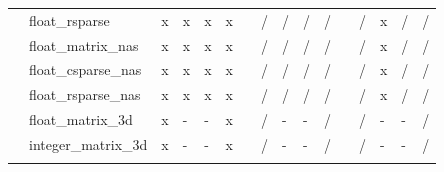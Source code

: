\documentclass{article}
\begin{document}
\begin{longtable}{llllllllllllllll}
                & float\_rsparse            & \cellcolor[HTML]{B7E1CD}x & \cellcolor[HTML]{B7E1CD}x & \cellcolor[HTML]{B7E1CD}x & \cellcolor[HTML]{B7E1CD}x &  & \cellcolor[HTML]{F4CCCC}/ & \cellcolor[HTML]{F4CCCC}/ & \cellcolor[HTML]{F4CCCC}/ & \cellcolor[HTML]{F4CCCC}/ &  & \cellcolor[HTML]{F4CCCC}/ & \cellcolor[HTML]{B7E1CD}x & \cellcolor[HTML]{F4CCCC}/ & \cellcolor[HTML]{F4CCCC}/ \\
                & float\_matrix\_nas        & \cellcolor[HTML]{B7E1CD}x & \cellcolor[HTML]{B7E1CD}x & \cellcolor[HTML]{B7E1CD}x & \cellcolor[HTML]{B7E1CD}x &  & \cellcolor[HTML]{F4CCCC}/ & \cellcolor[HTML]{F4CCCC}/ & \cellcolor[HTML]{F4CCCC}/ & \cellcolor[HTML]{F4CCCC}/ &  & \cellcolor[HTML]{F4CCCC}/ & \cellcolor[HTML]{B7E1CD}x & \cellcolor[HTML]{F4CCCC}/ & \cellcolor[HTML]{F4CCCC}/ \\
                & float\_csparse\_nas       & \cellcolor[HTML]{B7E1CD}x & \cellcolor[HTML]{B7E1CD}x & \cellcolor[HTML]{B7E1CD}x & \cellcolor[HTML]{B7E1CD}x &  & \cellcolor[HTML]{F4CCCC}/ & \cellcolor[HTML]{F4CCCC}/ & \cellcolor[HTML]{F4CCCC}/ & \cellcolor[HTML]{F4CCCC}/ &  & \cellcolor[HTML]{F4CCCC}/ & \cellcolor[HTML]{B7E1CD}x & \cellcolor[HTML]{F4CCCC}/ & \cellcolor[HTML]{F4CCCC}/ \\
                & float\_rsparse\_nas       & \cellcolor[HTML]{B7E1CD}x & \cellcolor[HTML]{B7E1CD}x & \cellcolor[HTML]{B7E1CD}x & \cellcolor[HTML]{B7E1CD}x &  & \cellcolor[HTML]{F4CCCC}/ & \cellcolor[HTML]{F4CCCC}/ & \cellcolor[HTML]{F4CCCC}/ & \cellcolor[HTML]{F4CCCC}/ &  & \cellcolor[HTML]{F4CCCC}/ & \cellcolor[HTML]{B7E1CD}x & \cellcolor[HTML]{F4CCCC}/ & \cellcolor[HTML]{F4CCCC}/ \\
                & float\_matrix\_3d         & \cellcolor[HTML]{B7E1CD}x & \cellcolor[HTML]{CFE2F3}- & \cellcolor[HTML]{CFE2F3}- & \cellcolor[HTML]{B7E1CD}x &  & \cellcolor[HTML]{F4CCCC}/ & \cellcolor[HTML]{CFE2F3}- & \cellcolor[HTML]{CFE2F3}- & \cellcolor[HTML]{F4CCCC}/ &  & \cellcolor[HTML]{F4CCCC}/ & \cellcolor[HTML]{CFE2F3}- & \cellcolor[HTML]{CFE2F3}- & \cellcolor[HTML]{F4CCCC}/ \\
                & integer\_matrix\_3d       & \cellcolor[HTML]{B7E1CD}x & \cellcolor[HTML]{CFE2F3}- & \cellcolor[HTML]{CFE2F3}- & \cellcolor[HTML]{B7E1CD}x &  & \cellcolor[HTML]{F4CCCC}/ & \cellcolor[HTML]{CFE2F3}- & \cellcolor[HTML]{CFE2F3}- & \cellcolor[HTML]{F4CCCC}/ &  & \cellcolor[HTML]{F4CCCC}/ & \cellcolor[HTML]{CFE2F3}- & \cellcolor[HTML]{CFE2F3}- & \cellcolor[HTML]{F4CCCC}/ \\
                &                           &                           &                           &                           &                           &  &                           &                           &                           &                           &  &                           &                           &                           &                           \\

\end{longtable}
\end{document}

